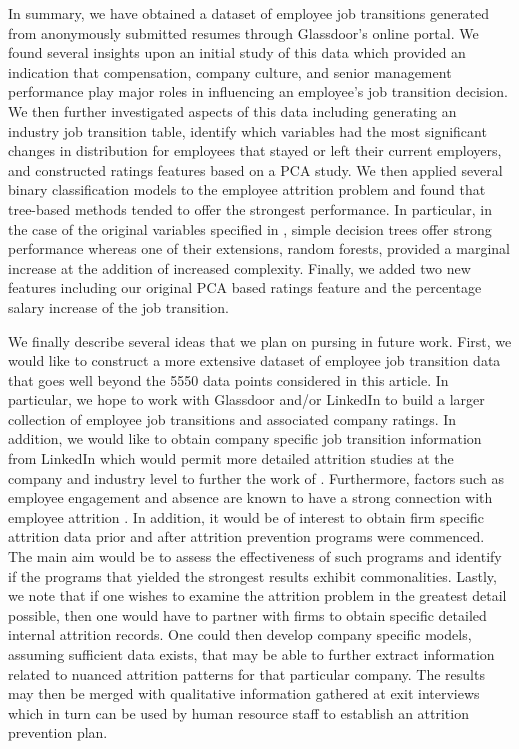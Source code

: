\documentclass[10pt]{article}
\begin{document}
In summary, we have obtained a dataset of employee job transitions generated from 
anonymously submitted resumes through Glassdoor's online portal. We found several 
insights upon an initial study of this data which provided an indication that 
compensation, company culture, and senior management performance play major 
roles in influencing an employee's job transition decision.  We then further investigated 
aspects of this data including generating an industry job transition table, identify 
which variables had the most significant changes in distribution for employees 
that stayed or left their current employers, and constructed ratings features 
based on a PCA study. We then applied several binary classification models 
to the employee attrition problem and found that tree-based methods tended to 
offer the strongest performance.  In particular, in the case of the original 
variables specified in \cite{Smart2016}, simple decision trees offer strong 
performance whereas one of their extensions, random forests, provided a 
marginal increase at the addition of increased complexity.  Finally, we added 
two new features including our original PCA based ratings feature
and the percentage salary increase of the job transition.  

We finally describe several ideas that we plan on pursing in future work.  First, 
we would like to construct a more extensive dataset of employee job transition data that goes
well beyond the 5550 data points considered in this article.  In particular, 
we hope to work with Glassdoor and/or LinkedIn to build a larger collection of 
employee job transitions and associated company ratings. In addition, we would like to 
obtain company specific job transition information from LinkedIn which would permit 
more detailed attrition studies at the company and industry level to further 
the work of \cite{Bennet1993}.  Furthermore, factors such as employee 
engagement and absence are known to have a strong connection with employee attrition 
\cite{Kumar2015,Mitra1992}.  In addition, it would be of interest to obtain 
firm specific attrition data prior and after attrition prevention programs 
were commenced.  The main aim would be to assess the effectiveness of such programs 
and identify if the programs that yielded the strongest results exhibit 
commonalities.  Lastly, we 
note that if one wishes to examine the attrition problem in the greatest detail 
possible, then one would have to partner with firms to obtain specific detailed 
internal attrition records.  One could then develop company specific models, 
assuming sufficient data exists, that may be able to further extract information 
related to nuanced attrition patterns for that particular company.  The results 
may then be merged with qualitative information gathered at exit interviews which  
in turn can be used by human resource staff to establish an attrition prevention plan. 
\end{document}
